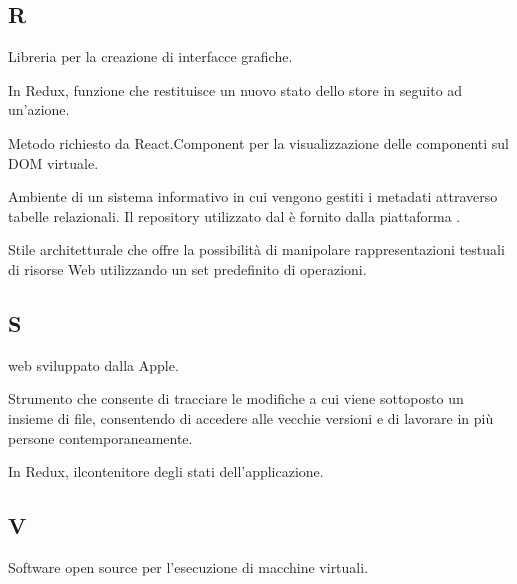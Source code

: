 	\subsection{R}
	
		Libreria  per la creazione di interfacce grafiche.
		
		In Redux, funzione che restituisce un nuovo stato dello store in seguito ad un'azione.
		
		Metodo richiesto da React.Component per la visualizzazione delle componenti sul DOM virtuale.
		
		Ambiente di un sistema informativo in cui vengono gestiti i metadati attraverso
		tabelle relazionali. Il repository utilizzato dal  \zephyrus{} è fornito
		dalla piattaforma .
		
		Stile architetturale che offre la possibilità di manipolare rappresentazioni testuali di risorse Web utilizzando un set predefinito di operazioni.
	
	\subsection{S}
	
		 web sviluppato dalla Apple.
		
		Strumento che consente di tracciare le modifiche a cui viene sottoposto un insieme di file, consentendo di accedere alle vecchie versioni e di lavorare in più persone contemporaneamente.
		
		In Redux, ilcontenitore degli stati dell'applicazione.
		
	\subsection{V}
		Software open source per l'esecuzione di macchine virtuali.
